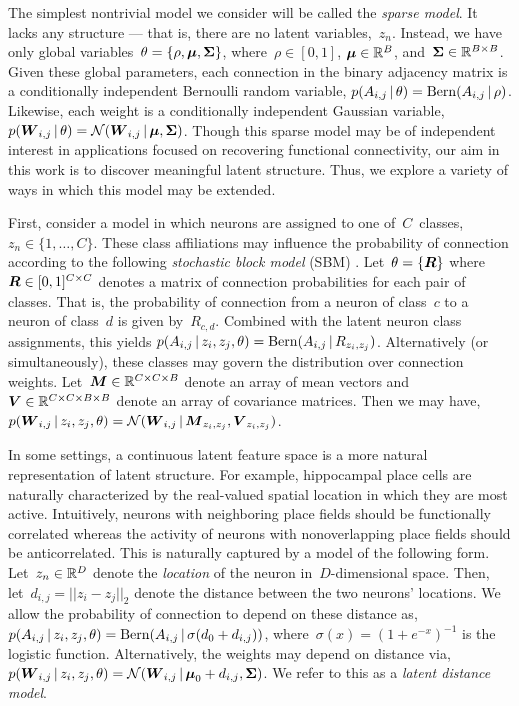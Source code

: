 The simplest nontrivial model we consider will be called the \emph{sparse model}.
It lacks any structure --- that is, there are no latent variables,~$z_n$. 
Instead, we have only global variables~$\theta = \{\rho, \boldsymbol{\mu}, \boldsymbol{\Sigma} \}$, where~${\rho \in [0,1]}$, ${\boldsymbol{\mu} \in \mathbb{R}^B}$, and~${\boldsymbol{\Sigma} \in \mathbb{R}^{B \times B}}$. 
Given these global parameters, each connection in the binary adjacency matrix is a conditionally independent Bernoulli random variable,
${p(A_{i,j} \,|\, \theta) = \mathrm{Bern}(A_{i,j} \,|\, \rho)}$.
Likewise, each weight is a conditionally independent Gaussian variable,
${p(\boldsymbol{W}_{i,j} \,|\, \theta) = \mathcal{N}(\boldsymbol{W}_{i,j} \,|\, \boldsymbol{\mu}, \boldsymbol{\Sigma})}$.
Though this sparse model may be of independent interest in applications focused on recovering functional connectivity, our aim in this work is to discover meaningful latent structure. 
Thus, we explore a variety of ways in which this model may be extended.

First, consider a model in which neurons are assigned to one of~$C$~classes,~$z_n \in \{1, \ldots, C\}$. 
These class affiliations may influence the probability of connection according to the following \emph{stochastic block model} (SBM) \cite{Nowicki-2001}. 
Let~$\theta = \{\boldsymbol{R}\}$ where~${\boldsymbol{R} \in [0,1]^{C \times C}}$ denotes a matrix of connection probabilities for each pair of classes. 
That is, the probability of connection from a neuron of class~$c$ to a neuron of class~$d$ is given by~$R_{c,d}$.
Combined with the latent neuron class assignments, this yields
${p(A_{i,j} \,|\, z_i, z_j, \theta) = \mathrm{Bern}(A_{i,j} \,|\, R_{z_i, z_j})}$.
Alternatively (or simultaneously), these classes may govern the distribution over connection weights. 
Let~${\boldsymbol{M} \in \mathbb{R}^{C \times C \times B}}$ denote an array of mean vectors and~
${\boldsymbol{V} \in \mathbb{R}^{C \times C \times B \times B}}$ denote an array of covariance matrices. 
Then we may have,
${p(\boldsymbol{W}_{i,j} \,|\, z_i, z_j, \theta) = \mathcal{N}(\boldsymbol{W}_{i,j} \,|\, \boldsymbol{M}_{z_i, z_j}, \boldsymbol{V}_{z_i,z_j})}$.

In some settings, a continuous latent feature space is a more natural representation of latent structure. 
For example, hippocampal place cells are naturally characterized by the real-valued spatial location in which they are most active. 
Intuitively, neurons with neighboring place fields should be functionally correlated whereas the activity of neurons with nonoverlapping place fields should be anticorrelated.
This is naturally captured by a model of the following form.
Let~$z_n \in \mathbb{R}^D$ denote the \emph{location} of the neuron in~$D$-dimensional space. 
Then, let~${d_{i,j} = ||z_i - z_j||_2}$ denote the distance between the two neurons' locations.
We allow the probability of connection to depend on these distance as,
${p(A_{i,j} \,|\, z_i, z_j, \theta) = \mathrm{Bern}(A_{i,j} \,|\, \sigma(d_0 + d_{i,j}))}$,
where~${\sigma(x)=(1+e^{-x})^{-1}}$ is the logistic function.
Alternatively, the weights may depend on distance via,
${p(\boldsymbol{W}_{i,j} \,|\, z_i, z_j, \theta) = \mathcal{N}(\boldsymbol{W}_{i,j} \,|\, \boldsymbol{\mu}_0 + d_{i,j}, \boldsymbol{\Sigma})}$.
We refer to this as a \emph{latent distance model}.
